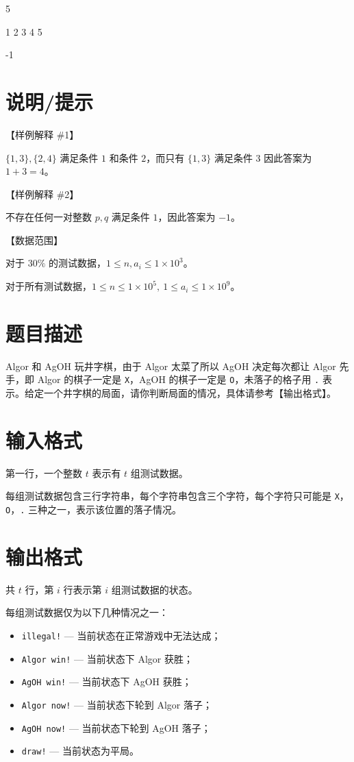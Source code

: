 \documentclass{../cpct/ctpro}
\begin{document}
\testcasetab
{
    5 \par
    1 2 3 4 5
}
{
    -1
}

\section*{说明/提示}

【样例解释 \#1】

$\{1,3 \},\{2,4 \}$ 满足条件 $1$ 和条件 $2$，而只有 $\{1,3 \}$ 满足条件 $3$ 因此答案为 $1 + 3 = 4$。

【样例解释 \#2】

不存在任何一对整数 $p,q$ 满足条件 $1$，因此答案为 $-1$。

【数据范围】

对于 $30 \%$ 的测试数据，$1 \leq n,a_i \leq 1 \times {10}^{3}$。

对于所有测试数据，$1 \leq n \leq 1 \times {10}^{5},~1 \leq a_i \leq 1 \times {10}^{9}$。

\makeproblem
\section*{题目描述}

Algor 和 AgOH 玩井字棋，由于 Algor 太菜了所以 AgOH 决定每次都让 Algor 先手，即 Algor 的棋子一定是 \texttt{X}，AgOH 的棋子一定是 \texttt{O}，未落子的格子用 \texttt{.} 表示。给定一个井字棋的局面，请你判断局面的情况，具体请参考【输出格式】。

\section*{输入格式}

第一行，一个整数 $t$ 表示有 $t$ 组测试数据。

每组测试数据包含三行字符串，每个字符串包含三个字符，每个字符只可能是 \texttt{X}，\texttt{O}，\texttt{.} 三种之一，表示该位置的落子情况。

\section*{输出格式}

共 $t$ 行，第 $i$ 行表示第 $i$ 组测试数据的状态。

每组测试数据仅为以下几种情况之一：

\begin{itemize}
    \item \texttt{illegal!} — 当前状态在正常游戏中无法达成；
    \item \texttt{Algor win!} — 当前状态下 Algor 获胜；
    \item \texttt{AgOH win!} — 当前状态下 AgOH 获胜；
    \item \texttt{Algor now!} — 当前状态下轮到 Algor 落子；
    \item \texttt{AgOH now!} — 当前状态下轮到 AgOH 落子；
    \item \texttt{draw!} — 当前状态为平局。
\end{itemize}
\end{document}
